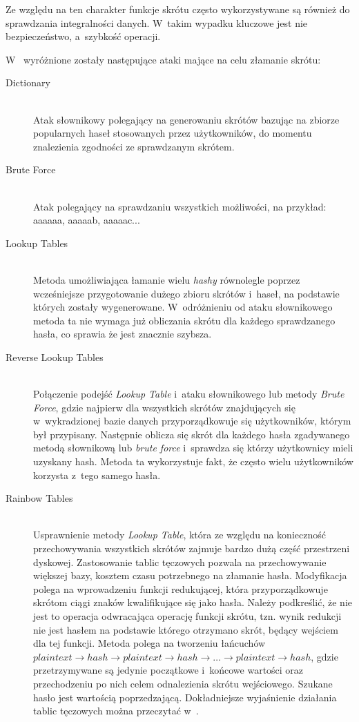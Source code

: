 \documentclass[11pt]{aghdpl}
\begin{document}
Ze względu na ten charakter funkcje skrótu często wykorzystywane są również do sprawdzania integralności danych. W~takim wypadku kluczowe jest nie bezpieczeństwo, a~szybkość operacji.

W~\cite{CSH} wyróżnione zostały następujące ataki mające na celu złamanie skrótu:
\begin{description}
\item[Dictionary] \hfill \\
Atak słownikowy polegający na generowaniu skrótów bazując na zbiorze popularnych haseł stosowanych przez użytkowników, do momentu znalezienia zgodności ze sprawdzanym skrótem.
\item[Brute Force] \hfill \\
Atak polegający na sprawdzaniu wszystkich możliwości, na przykład: aaaaaa, aaaaab, aaaaac...
\item[Lookup Tables] \hfill \\
Metoda umożliwiająca łamanie wielu \emph{hashy} równolegle poprzez wcześniejsze przygotowanie dużego zbioru skrótów i~haseł, na podstawie których zostały wygenerowane. W~odróżnieniu od ataku słownikowego metoda ta nie wymaga już obliczania skrótu dla każdego sprawdzanego hasła, co sprawia że jest znacznie szybsza.
\item[Reverse Lookup Tables] \hfill \\
Połączenie podejść \emph{Lookup Table} i~ataku słownikowego lub metody \emph{Brute Force}, gdzie najpierw dla wszystkich skrótów znajdujących się w~wykradzionej bazie danych przyporządkowuje się użytkowników, którym był przypisany. Następnie oblicza się skrót dla każdego hasła zgadywanego metodą słownikową lub \emph{brute force} i~sprawdza się którzy użytkownicy mieli uzyskany hash. Metoda ta wykorzystuje fakt, że często wielu użytkowników korzysta z~tego samego hasła.
\item[Rainbow Tables] \hfill \\
Usprawnienie metody \emph{Lookup Table}, która ze względu na konieczność przechowywania wszystkich skrótów zajmuje bardzo dużą część przestrzeni dyskowej. Zastosowanie tablic tęczowych pozwala na przechowywanie większej bazy, kosztem czasu potrzebnego na złamanie hasła. Modyfikacja polega na wprowadzeniu funkcji redukującej, która przyporządkowuje skrótom ciągi znaków kwalifikujące się jako hasła. Należy podkreślić, że nie jest to operacja odwracająca operację funkcji skrótu, tzn. wynik redukcji nie jest hasłem na podstawie którego otrzymano skrót, będący wejściem dla tej funkcji. Metoda polega na tworzeniu łańcuchów $plaintext \rightarrow hash \rightarrow plaintext \rightarrow hash \rightarrow \ldots \rightarrow plaintext \rightarrow hash$, gdzie przetrzymywane są jedynie początkowe i~końcowe wartości oraz przechodzeniu po nich celem odnalezienia skrótu wejściowego. Szukane hasło jest wartością poprzedzającą. Dokładniejsze wyjaśnienie działania tablic tęczowych można przeczytać w~\cite{RT}.
\end{description}
\end{document}
